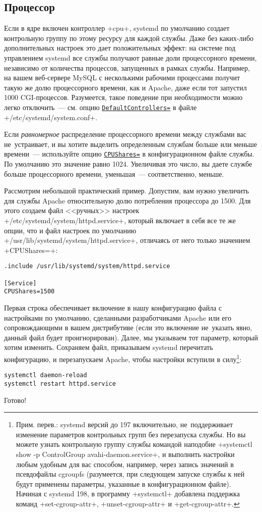 \documentclass[10pt,oneside,a4paper]{article}
\newcommand{\hreftt}[2]{\href{#1}{\texttt{#2}}}
\begin{document}
\subsection{Процессор}

Если в ядре включен контроллер +cpu+, systemd по умолчанию создает контрольную
группу по этому ресурсу для каждой службы. Даже без каких-либо дополнительных
настроек это дает положительных эффект: на системе под управлением systemd все
службы получают равные доли процессорного времени, независимо от количества
процессов, запущенных в рамках службы. Например, на вашем веб-сервере MySQL с
несколькими рабочими процессами получит такую же долю процессорного времени,
как и Apache, даже если тот запустил 1000 CGI-процессов. Разумеется, такое
поведение при необходимости можно легко отключить~--- см. опцию
\hreftt{http://0pointer.de/public/systemd-man/systemd.conf.html}{DefaultControllers=}
в файле +/etc/systemd/system.conf+.

Если \emph{равномерное} распределение процессорного времени между службами вас
не~устраивает, и вы хотите выделить определенным службам больше или меньше
времени~--- используйте опцию
\hreftt{http://0pointer.de/public/systemd-man/systemd.exec.html}{CPUShares=} в
конфигурационном файле службы. По умолчанию это значение равно 1024. Увеличивая
это число, вы даете службе больше процессорного времени, уменьшая~---
соответственно, меньше.

Рассмотрим небольшой практический пример. Допустим, вам нужно увеличить
для службы Apache относительную долю потребления процессора до 1500. Для этого
создаем файл <<ручных>> настроек +/etc/systemd/system/httpd.service+, который
включает в себя все те же опции, что и файл настроек по умолчанию
+/usr/lib/systemd/system/httpd.service+, отличаясь от него только значением
+CPUShares=+:
\begin{Verbatim}
.include /usr/lib/systemd/system/httpd.service

[Service]
CPUShares=1500
\end{Verbatim}
Первая строка обеспечивает включение в нашу конфигурацию файла с настройками по
умолчанию, сделанными разработчиками Apache или его сопровождающими в вашем
дистрибутиве (если это включение не~указать явно, данный файл будет проигнорирован).
Далее, мы указываем тот параметр, который хотим изменить. Сохраняем файл,
приказываем systemd перечитать конфигурацию, и перезапускаем Apache, чтобы
настройки вступили в силу\footnote{Прим. перев.: systemd версий до 197
включительно, не~поддерживает изменение параметров контрольных групп без
перезапуска службы. Но вы можете узнать контрольную группу службы командой
наподобие +systemctl show -p ControlGroup avahi-daemon.service+, и выполнить
настройки любым удобным для вас способом, например, через запись значений в
псевдофайлы cgroupfs (разумеется, при следующем запуске службы к ней будут
применены параметры, указанные в конфигурационном файле). Начиная с systemd 198,
в программу +systemctl+ добавлена поддержка команд +set-cgroup-attr+,
+unset-cgroup-attr+ и +get-cgroup-attr+.}:
\begin{Verbatim}
systemctl daemon-reload
systemctl restart httpd.service
\end{Verbatim}
Готово!
\end{document}
